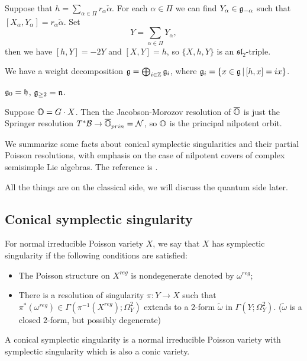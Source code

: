 Suppose that $h = \sum_{\alpha \in \Pi} r_{\alpha} \check{\alpha}$. For each $\alpha \in \Pi$ we can find $Y_{\alpha} \in \mathfrak{g}_{-\alpha}$ such that $[X_{\alpha}, Y_{\alpha}] = r_{\alpha}\check{\alpha}$. Set
\[
  Y = \sum_{\alpha \in \Pi} Y_{\alpha},
\]
then we have $[h, Y] = -2Y$ and $[X, Y] = h$, so $\{X, h, Y\}$ is an $\mathfrak{sl}_2$-triple.

We have a weight decomposition $\mathfrak{g} = \bigoplus_{i \in \mathbb{Z}} \mathfrak{g}_i$, where $\mathfrak{g}_i = \{x \in \mathfrak{g}\,|\,[h, x] = ix\}$.

\begin{lem}
  $\mathfrak{g}_0 = \mathfrak{h}$, $\mathfrak{g}_{\geq 2} = \mathfrak{n}$.
\end{lem}

Suppose $\mathbb{O} = G\cdot X$. Then the Jacobson-Morozov resolution of $\overline{\mathbb{O}}$ is just the Springer resolution $T^*\mathcal{B} \to \overline{\mathbb{O}}_{prin} = \mathcal{N}$, so $\mathbb{O}$ is the principal nilpotent orbit.





We summarize some facts about conical symplectic singularities and their partial Poisson resolutions, with emphasis on the case of nilpotent covers of complex semisimple Lie algebras. The reference is \cite{Losev2022Topics}.

All the things are on the classical side, we will discuss the quantum side later.

\subsection{Conical symplectic singularity}

\begin{defn}
  For normal irreducible Poisson variety $X$, we say that $X$ has symplectic singularity if the following conditions are satisfied:
  \begin{itemize}
    \item The Poisson structure on $X^{reg}$ is nondegenerate denoted by $\omega^{reg}$;
    \item There is a resolution of singularity $\pi: Y \to X $ such that $\pi^{*}(\omega^{reg}) \in \Gamma(\pi^{-1}(X^{reg});\Omega_Y^2)$ extends to a 2-form $\widetilde{\omega}$ in $\Gamma(Y;\Omega_Y^2)$. ($\widetilde{\omega}$ is a closed $2$-form, but possibly degenerate)
  \end{itemize}
\end{defn}

\begin{defn}
  A conical symplectic singularity is a normal irreducible Poisson variety with symplectic singularity which is also a conic variety.
\end{defn}

